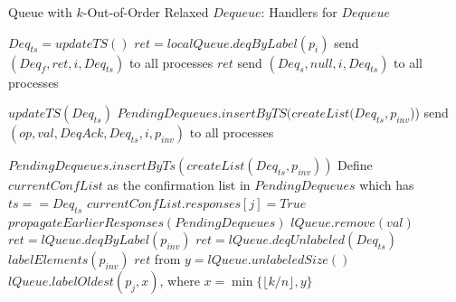 \documentclass[a4paper,anonymous,USenglish]{lipics-v2021} %
\theoremstyle{definition}
\begin{document}
\begin{algorithm}
  \caption{Queue with $k$-Out-of-Order Relaxed $Dequeue$: Handlers for $Dequeue$}\label{alg:relaxed}
  \begin{algorithmic}[1]
      \State $Deq_{ts} = updateTS()$
      \label{oooline:checkFast}
        \State $ret = localQueue.deqByLabel(p_i)$ \label{oooline:fastDeq}
        \State send $(Deq_f, ret, i, Deq_{ts})$ to all processes
        \State \Return $ret$ \label{oooline:fastDeqResponse}
      \Else
        \State send $(Deq_s, null, i, Deq_{ts})$ to all processes
      \EndIf
    \EndFunction

      \State $updateTS(Deq_{ts})$
        \State $PendingDequeues.insertByTS(createList(Deq_{ts}, p_{inv}$))
      \EndIf
      \State send $(op, val, DeqAck, Deq_{ts}, i, p_{inv})$ to all processes
    \EndFunction

        \State $PendingDequeues.insertByTs(createList(Deq_{ts}, p_{inv}))$
      \EndIf
      \State Define $currentConfList$ as the confirmation list in $PendingDequeues$ which has $ts == Deq_{ts}$
      \State $currentConfList.responses[j] = True$
      \State $propagateEarlierResponses(PendingDequeues)$ 
        \label{oooline:localExec}
             $lQueue.remove(val)$\EndIf
          \Else    
              \State $ret = lQueue.deqByLabel(p_{inv})$ \label{oooline:sDeqChooseLabeled}
            \Else
              \State $ret = lQueue.deqUnlabeled(Deq_{ts})$ \label{oooline:sDeqChooseUnlabeled}
            \EndIf
            \State $labelElements(p_{inv})$\label{oooline:label}
              \State \Return $ret$
            \EndIf
          \EndIf 
        \EndIf 
      \EndFor
      \EndFunction
%
       from \cite{TalmageWelch14}
      \State $y = lQueue.unlabeledSize()$
      \State $lQueue.labelOldest(p_j,x)$, where $x = \min\{\lfloor k/n\rfloor, y\}$\label{oooline:labelOldest}
      \EndFunction
  \end{algorithmic}
\end{algorithm}
\end{document}
